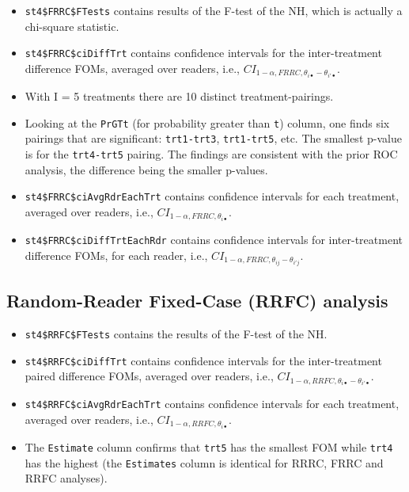 \documentclass[
]{book}
\begin{document}
\begin{itemize}
\item
  \texttt{st4\$FRRC\$FTests} contains results of the F-test of the NH, which is actually a chi-square statistic.
\item
  \texttt{st4\$FRRC\$ciDiffTrt} contains confidence intervals for the inter-treatment difference FOMs, averaged over readers, i.e., \(CI_{1-\alpha,FRRC,\theta_{i \bullet} - \theta_{i' \bullet}}\).
\item
  With I = 5 treatments there are 10 distinct treatment-pairings.
\item
  Looking at the \texttt{PrGTt} (for probability greater than \texttt{t}) column, one finds six pairings that are significant: \texttt{trt1-trt3}, \texttt{trt1-trt5}, etc. The smallest p-value is for the \texttt{trt4-trt5} pairing. The findings are consistent with the prior ROC analysis, the difference being the smaller p-values.
\item
  \texttt{st4\$FRRC\$ciAvgRdrEachTrt} contains confidence intervals for each treatment, averaged over readers, i.e., \(CI_{1-\alpha,FRRC,\theta_{i \bullet}}\).
\item
  \texttt{st4\$FRRC\$ciDiffTrtEachRdr} contains confidence intervals for inter-treatment difference FOMs, for each reader, i.e., \(CI_{1-\alpha,FRRC,\theta_{i j} - \theta_{i' j}}\).
\end{itemize}

\hypertarget{ORApplications-RRFC-dataset04-FROC-DBM}{%
\subsection{Random-Reader Fixed-Case (RRFC) analysis}\label{ORApplications-RRFC-dataset04-FROC-DBM}}

\begin{itemize}
\item
  \texttt{st4\$RRFC\$FTests} contains the results of the F-test of the NH.
\item
  \texttt{st4\$RRFC\$ciDiffTrt} contains confidence intervals for the inter-treatment paired difference FOMs, averaged over readers, i.e., \(CI_{1-\alpha,RRFC,\theta_{i \bullet} - \theta_{i' \bullet}}\).
\item
  \texttt{st4\$RRFC\$ciAvgRdrEachTrt} contains confidence intervals for each treatment, averaged over readers, i.e., \(CI_{1-\alpha,RRFC,\theta_{i \bullet}}\).
\item
  The \texttt{Estimate} column confirms that \texttt{trt5} has the smallest FOM while \texttt{trt4} has the highest (the \texttt{Estimates} column is identical for RRRC, FRRC and RRFC analyses).
\end{itemize}
\end{document}
